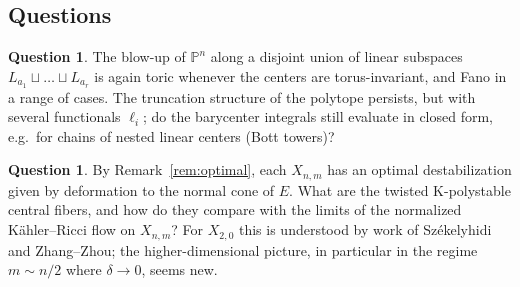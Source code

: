 \documentclass[11pt]{amsart}
\theoremstyle{definition}
\newtheorem{question}[theorem]{Question}
\theoremstyle{remark}
\newcommand{\PP}{\mathbb{P}}
\begin{document}
\subsection{Questions}

\begin{question}
The blow-up of $\PP^n$ along a disjoint union of linear subspaces
$L_{a_1}\sqcup\dots\sqcup L_{a_r}$ is again toric whenever the centers
are torus-invariant, and Fano in a range of cases. The truncation
structure of the polytope persists, but with several functionals
$\ell_i$; do the barycenter integrals still evaluate in closed form,
e.g.\ for chains of nested linear centers (Bott towers)?
\end{question}

\begin{question}
By Remark~\ref{rem:optimal}, each $X_{n,m}$ has an optimal
destabilization given by deformation to the normal cone of $E$. What
are the twisted K-polystable central fibers, and how do they compare
with the limits of the normalized K\"ahler--Ricci flow on $X_{n,m}$?
For $X_{2,0}$ this is understood by work of Sz\'ekelyhidi and
Zhang--Zhou; the higher-dimensional picture, in particular in the
regime $m\sim n/2$ where $\delta\to0$, seems new.
\end{question}
\end{document}
